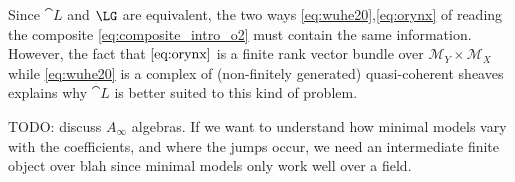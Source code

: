 Since $\cat{L}$ and $\LG$ are equivalent, the two ways \eqref{eq:wuhe20},\eqref{eq:orynx} of reading the composite \eqref{eq:composite_intro_o2} must contain the same information. However, the fact that $\eqref{eq:orynx}$ is a finite rank vector bundle over $\mathscr{M}_Y \times \mathscr{M}_X$ while \eqref{eq:wuhe20} is a complex of (non-finitely generated) quasi-coherent sheaves explains why $\cat{L}$ is better suited to this kind of problem.


TODO: discuss $A_\infty$ algebras. If we want to understand how minimal models vary with the coefficients, and where the jumps occur, we need an intermediate finite object over blah since minimal models only work well over a field.
